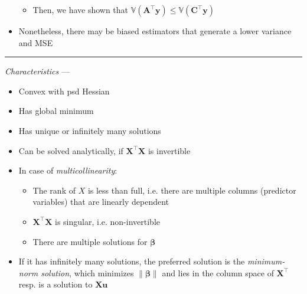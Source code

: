 \begin{itemize}
\begin{itemize}
        \item Then, we have shown that $\mathbb{V}(\boldsymbol{A}^\intercal \boldsymbol{y}) \leq \mathbb{V}(\boldsymbol{C}^\intercal \boldsymbol{y})$
    \end{itemize}
    \item Nonetheless, there may be biased estimators that generate a lower variance and MSE
\end{itemize}

{\color{lightgray}\hrule height 0.001mm}

\emph{Characteristics} --- 
\begin{itemize}
    \item Convex with psd Hessian
    \item Has global minimum
    \item Has unique or infinitely many solutions
    \item Can be solved analytically, if $\boldsymbol{X}^\intercal \boldsymbol{X}$ is invertible
    \item In case of \emph{multicollinearity}:
    \begin{itemize}
        \item The rank of $X$ is less than full, i.e. there are multiple columns (predictor variables) that are linearly dependent
        \item $\boldsymbol{X}^\intercal \boldsymbol{X}$ is singular, i.e. non-invertible
        \item There are multiple solutions for $\boldsymbol{\beta}$
    \end{itemize}
    \item If it has infinitely many solutions, the preferred solution is the \emph{minimum-norm solution}, which minimizes $\| \boldsymbol{\beta} \|$ and lies in the column space of $\boldsymbol{X}^\intercal$ resp. is a solution to $\boldsymbol{X}\boldsymbol{u}$
\end{itemize}